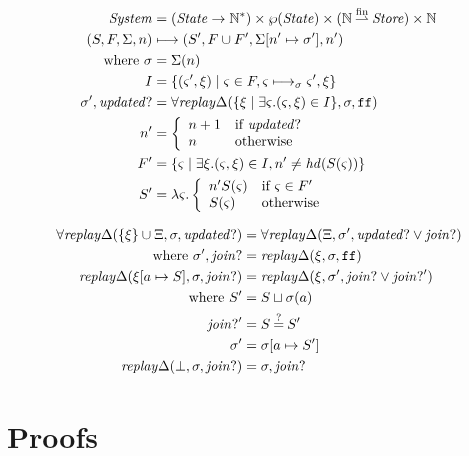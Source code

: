 \documentclass{llncs}
\newcommand{\finto}{\mathbin{\overset{\text{fin}}{\rightharpoonup}}}
\newcommand{\setof}[1]{\{ #1 \}}
\begin{document}
\begin{align*}
\System &= (\State \to {\mathbb N}^*) \times \wp(\State) \times ({\mathbb N} \finto \Store) \times {\mathbb N} \\
(S,F,\Sigma,n) &\machstep (S', F \cup F', \Sigma[n' \mapsto \msto'],n') \\
 \text{ where }
 \msto &= \Sigma(n) \\
  I &= \setof{ \ttuple{\mstate'}{\msdiff} \mid \mstate \in F, \mstate \machstep_\msto \mstate', \msdiff} \\
  \msto',\updatedp &=
     \replaychangeall(\setof{\msdiff \mid \exists \mstate. (\mstate, \msdiff) \in I}, \msto,\sfalse) \\
  n' &= \left\{\begin{array}{ll}
                n + 1 & \text{if } \updatedp \\
                n & \text{otherwise}
               \end{array}\right. \\
  F' &= \setof{\mstate \mid \exists \msdiff. (\mstate,\msdiff) \in I,
                n' \neq \hd(S(\mstate))} \\
  S' &= \lambda \mstate. \left\{\begin{array}{ll}
                                 n' S(\mstate) & \text{if } \mstate \in F' \\
                                 S(\mstate) & \text{otherwise}
                                \end{array}\right.
\end{align*}

\begin{align*}
  \replaychangeall(\setof{\msdiff} \cup \Xi, \msto, \updatedp) &=
    \replaychangeall(\Xi, \msto', \updatedp \vee \joinp) \\
   \text{ where } \msto', \joinp &= \replaychange(\msdiff, \msto, \sfalse) \\
  \replaychange(\msdiff[\maddr \mapsto S], \msto, \joinp) &=
   \replaychange(\msdiff, \msto', \joinp \vee \joinp') \\
  \text{ where } S' &= S \sqcup \msto(\maddr) \\
                 \joinp' &= S \deceq S' \\
                 \msto' &= \msto[\maddr \mapsto S'] \\
  \replaychange(\bot, \msto, \joinp) &= \msto, \joinp
\end{align*}

\section{Proofs}
\end{document}
